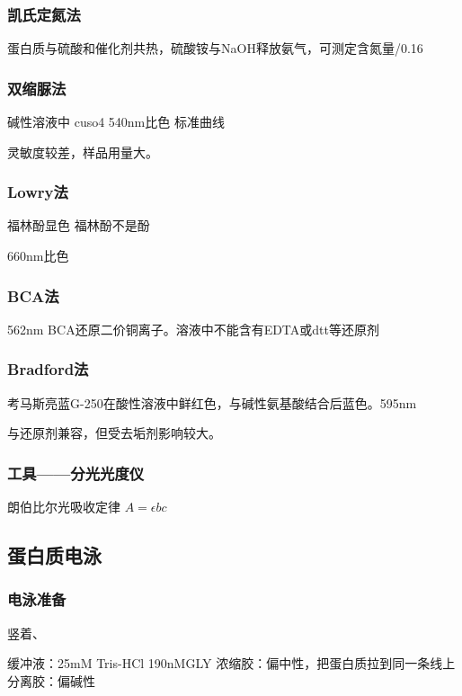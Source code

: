 \subsubsection{凯氏定氮法}

蛋白质与硫酸和催化剂共热，硫酸铵与NaOH释放氨气，可测定含氮量/0.16

\subsubsection{双缩脲法}

碱性溶液中 cuso4 540nm比色 标准曲线

灵敏度较差，样品用量大。

\subsubsection{Lowry法}

福林酚显色  福林酚不是酚

660nm比色

\subsubsection{BCA法}

562nm BCA还原二价铜离子。溶液中不能含有EDTA或dtt等还原剂

\subsubsection{Bradford法}

考马斯亮蓝G-250在酸性溶液中鲜红色，与碱性氨基酸结合后蓝色。595nm

与还原剂兼容，但受去垢剂影响较大。

\subsubsection{工具——分光光度仪}

朗伯比尔光吸收定律 $A=\epsilon bc$

\subsection{蛋白质电泳}

\subsubsection{电泳准备}

竖着、

缓冲液：25mM Tris-HCl  190nMGLY
浓缩胶：偏中性，把蛋白质拉到同一条线上
分离胶：偏碱性


